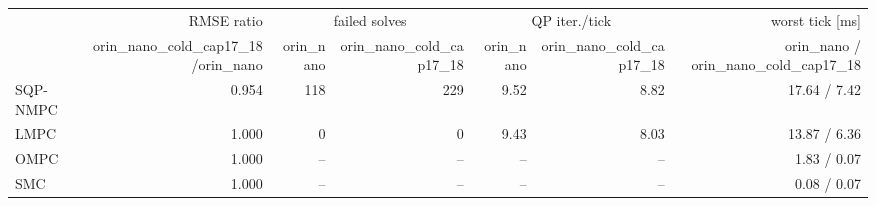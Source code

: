 \begin{tabular}{lrrrrrr}
\toprule
 & RMSE ratio & \multicolumn{2}{c}{failed solves} & \multicolumn{2}{c}{QP iter./tick} & worst tick [ms] \\
\cmidrule(lr){3-4}\cmidrule(lr){5-6}
 & orin\_nano\_cold\_cap17\_18/orin\_nano & orin\_nano & orin\_nano\_cold\_cap17\_18 & orin\_nano & orin\_nano\_cold\_cap17\_18 & orin\_nano / orin\_nano\_cold\_cap17\_18 \\
\midrule
SQP-NMPC & 0.954 & 118 & 229 & 9.52 & 8.82 & 17.64 / 7.42 \\
LMPC & 1.000 & 0 & 0 & 9.43 & 8.03 & 13.87 / 6.36 \\
OMPC & 1.000 & -- & -- & -- & -- & 1.83 / 0.07 \\
SMC & 1.000 & -- & -- & -- & -- & 0.08 / 0.07 \\
\bottomrule
\end{tabular}
